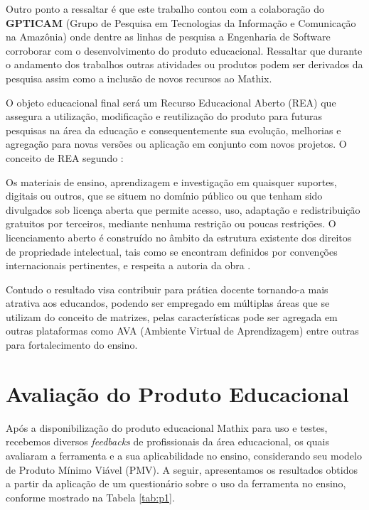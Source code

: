 Outro ponto a ressaltar é que este trabalho contou com a colaboração do \textbf{GPTICAM} (Grupo de Pesquisa em Tecnologias da Informação e Comunicação na Amazônia) onde dentre as linhas de pesquisa a Engenharia de Software corroborar com o desenvolvimento do produto educacional. Ressaltar que durante o andamento dos trabalhos outras atividades ou produtos podem ser derivados da pesquisa assim como a inclusão de novos recursos ao Mathix.


O objeto educacional final será um Recurso Educacional Aberto (REA) que assegura a utilização, modificação e reutilização do produto para futuras pesquisas na área da educação e consequentemente sua evolução, melhorias e agregação para novas versões ou aplicação em conjunto com novos projetos. O conceito de REA segundo \cite{nobre2016incorporar}:


\begin{citacao}
Os materiais de ensino, aprendizagem e investigação em quaisquer suportes, digitais ou outros, que se situem no domínio público ou que tenham sido divulgados sob licença aberta que permite acesso, uso, adaptação e redistribuição gratuitos por terceiros, mediante nenhuma restrição ou poucas restrições. O licenciamento aberto é construído no âmbito da estrutura existente dos direitos de propriedade intelectual, tais como se encontram definidos por convenções internacionais pertinentes, e respeita a autoria da obra \cite{nobre2016incorporar}.
\end{citacao}

Contudo o resultado visa contribuir para prática docente tornando-a mais atrativa aos educandos, podendo ser empregado em múltiplas áreas que se utilizam do conceito de matrizes, pelas características pode ser agregada em outras plataformas como AVA (Ambiente Virtual de Aprendizagem) entre outras para fortalecimento do ensino.




\section{Avaliação do Produto Educacional}
\label{avaliacao_pe}

Após a disponibilização do produto educacional Mathix para uso e testes, recebemos diversos \textit{feedbacks} de profissionais da área educacional, os quais avaliaram a ferramenta e a sua aplicabilidade no ensino, considerando seu modelo de Produto Mínimo Viável (PMV). A seguir, apresentamos os resultados obtidos a partir da aplicação de um questionário sobre o uso da ferramenta no ensino, conforme mostrado na Tabela \ref{tab:p1}.


